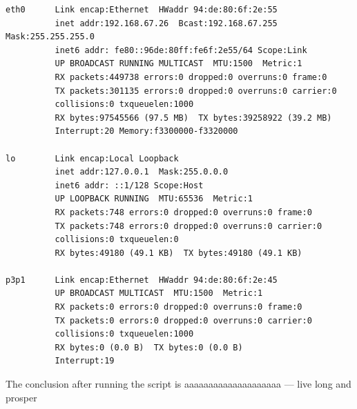 \documentclass{article}
\begin{document}
\begin{verbatim}
eth0      Link encap:Ethernet  HWaddr 94:de:80:6f:2e:55  
          inet addr:192.168.67.26  Bcast:192.168.67.255  Mask:255.255.255.0
          inet6 addr: fe80::96de:80ff:fe6f:2e55/64 Scope:Link
          UP BROADCAST RUNNING MULTICAST  MTU:1500  Metric:1
          RX packets:449738 errors:0 dropped:0 overruns:0 frame:0
          TX packets:301135 errors:0 dropped:0 overruns:0 carrier:0
          collisions:0 txqueuelen:1000 
          RX bytes:97545566 (97.5 MB)  TX bytes:39258922 (39.2 MB)
          Interrupt:20 Memory:f3300000-f3320000 

lo        Link encap:Local Loopback  
          inet addr:127.0.0.1  Mask:255.0.0.0
          inet6 addr: ::1/128 Scope:Host
          UP LOOPBACK RUNNING  MTU:65536  Metric:1
          RX packets:748 errors:0 dropped:0 overruns:0 frame:0
          TX packets:748 errors:0 dropped:0 overruns:0 carrier:0
          collisions:0 txqueuelen:0 
          RX bytes:49180 (49.1 KB)  TX bytes:49180 (49.1 KB)

p3p1      Link encap:Ethernet  HWaddr 94:de:80:6f:2e:45  
          UP BROADCAST MULTICAST  MTU:1500  Metric:1
          RX packets:0 errors:0 dropped:0 overruns:0 frame:0
          TX packets:0 errors:0 dropped:0 overruns:0 carrier:0
          collisions:0 txqueuelen:1000 
          RX bytes:0 (0.0 B)  TX bytes:0 (0.0 B)
          Interrupt:19 
\end{verbatim}

The conclusion after running the script is aaaaaaaaaaaaaaaaaaaa    --- live long and prosper
\end{document}
